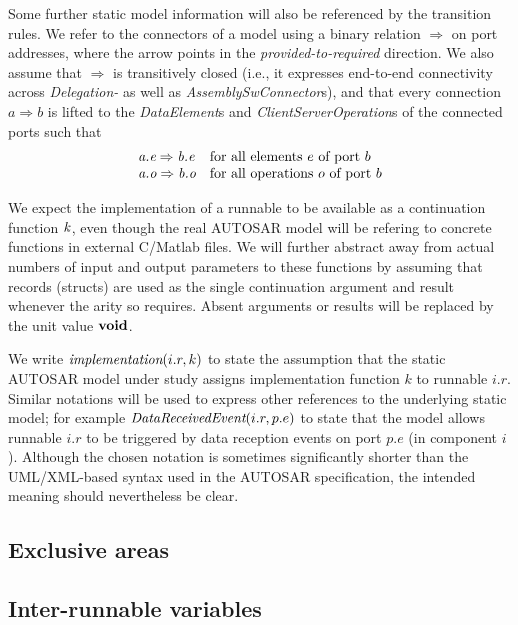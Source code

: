 \documentclass[twocolumn]{article}
\begin{document}
Some further static model information will also be referenced by the transition rules. We refer to the connectors of a model using a binary relation $\Rightarrow$ on port addresses, where the arrow points in the \emph{provided-to-required} direction. We also assume that $\Rightarrow$ is transitively closed (i.e., it expresses end-to-end connectivity across \emph{Delegation-} as well as \emph{AssemblySwConnector}s), and that every connection $a \Rightarrow b$ is lifted to the \emph{DataElement}s and \emph{ClientServerOperation}s of the connected ports such that
\[
\begin{array}{lll}
  \Tconnect{\Tp{e}{a}}{\Tp{e}{b}} & \text{for all elements $e$ of port $b$} \\
  \Tconnect{\Tp{o}{a}}{\Tp{o}{b}} & \text{for all operations $o$ of port $b$} \\
\end{array}
\]

We expect the implementation of a runnable to be available as a continuation function $\Cont$, even though the real AUTOSAR model will be refering to concrete functions in external C/Matlab files. We will further abstract away from actual numbers of input and output parameters to these functions by assuming that records (structs) are used as the single continuation argument and result whenever the arity so requires. Absent arguments or results will be replaced by the unit value $\Tvoid$.

We write $\Timplementation{i.r}{k}$ to state the assumption that the static AUTOSAR model under study assigns implementation function $k$ to runnable $i.r$. Similar notations will be used to express other references to the underlying static model; for example $\emph{DataReceivedEvent}(i.r, p.e)$ to state that the model allows runnable $i.r$ to be triggered by data reception events on port $p.e$ (in component $i$). Although the chosen notation is sometimes significantly shorter than the UML/XML-based syntax used in the AUTOSAR specification, the intended meaning should nevertheless be clear.

\subsection{Exclusive areas}


\subsection{Inter-runnable variables}
\end{document}
